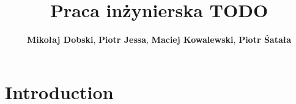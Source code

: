 \documentclass[a4paper,10pt]{report}
\title{\textbf{Praca inżynierska TODO}}
\author{\textbf{Mikołaj Dobski}, \textbf{Piotr Jessa}, \textbf{Maciej Kowalewski}, \textbf{Piotr Śatała}}
\date{}
\begin{document}
\maketitle

\tableofcontents

\newpage

\chapter{Introduction}

\end{document}
